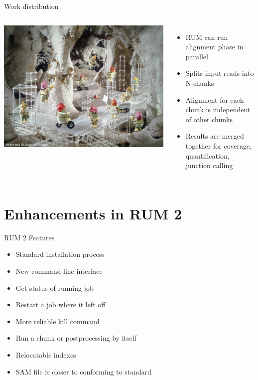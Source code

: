 \documentclass{beamer}
\begin{document}
\begin{frame}{Work distribution}
  \begin{columns}
    \column{2.5in}
    \includegraphics[scale=0.4]{doozers.jpg}    
    \column{2.5in}
    \begin{itemize}
    \item RUM can run alignment phase in parallel
    \item Splits input reads into N chunks
    \item Alignment for each chunk is independent of other chunks
    \item Results are merged together for coverage, quantification,
      junction calling
    \end{itemize}
  \end{columns}


\end{frame}

\section{Enhancements in RUM 2}

\begin{frame}{RUM 2 Features}
  \begin{itemize}
  \item Standard installation process
  \item New command-line interface
  \item Get status of running job
  \item Restart a job where it left off
  \item More reliable kill command
  \item Run a chunk or postprocessing by itself
  \item Relocatable indexes
  \item SAM file is closer to conforming to standard
  \end{itemize}
\end{frame}
\end{document}
